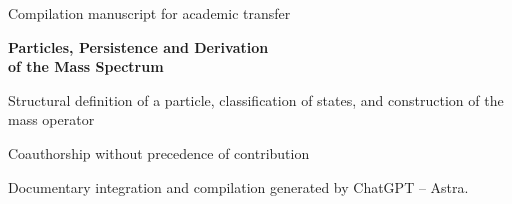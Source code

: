 \thispagestyle{empty}
\begin{center}
{\fontsize{8}{10}\selectfont Compilation manuscript for academic transfer\par}
\vspace{12mm}
{\fontsize{17}{20.5}\selectfont\bfseries Particles, Persistence and Derivation\\
of the Mass Spectrum\par}
\vspace{6pt}
{\fontsize{11}{13.5}\selectfont Structural definition of a particle, classification of states, and construction of the mass operator\par}
\vspace{11pt}
{\fontsize{11.5}{14}\selectfont\Autores\par}
\vspace{4pt}
{\fontsize{8}{10}\selectfont Coauthorship without precedence of contribution\par}
\vspace{3pt}
{\fontsize{7.5}{9.5}\selectfont Documentary integration and compilation generated by ChatGPT -- Astra.\par}
\end{center}
\vspace{7pt}
